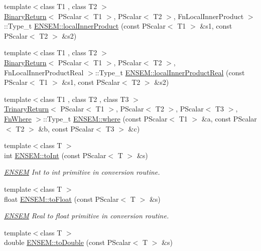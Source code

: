 \begin{DoxyCompactItemize}
\item 
{\footnotesize template$<$class T1 , class T2 $>$ }\\\mbox{\hyperlink{structBinaryReturn}{Binary\+Return}}$<$ P\+Scalar$<$ T1 $>$, P\+Scalar$<$ T2 $>$, Fn\+Local\+Inner\+Product $>$\+::Type\+\_\+t \mbox{\hyperlink{group__primscalar_ga1190a8f3bd7590e615a59825ca33f2b6}{E\+N\+S\+E\+M\+::local\+Inner\+Product}} (const P\+Scalar$<$ T1 $>$ \&s1, const P\+Scalar$<$ T2 $>$ \&s2)
\item 
{\footnotesize template$<$class T1 , class T2 $>$ }\\\mbox{\hyperlink{structBinaryReturn}{Binary\+Return}}$<$ P\+Scalar$<$ T1 $>$, P\+Scalar$<$ T2 $>$, Fn\+Local\+Inner\+Product\+Real $>$\+::Type\+\_\+t \mbox{\hyperlink{group__primscalar_ga014c96c783c136201ede1f2669b6d18b}{E\+N\+S\+E\+M\+::local\+Inner\+Product\+Real}} (const P\+Scalar$<$ T1 $>$ \&s1, const P\+Scalar$<$ T2 $>$ \&s2)
\item 
{\footnotesize template$<$class T1 , class T2 , class T3 $>$ }\\\mbox{\hyperlink{structTrinaryReturn}{Trinary\+Return}}$<$ P\+Scalar$<$ T1 $>$, P\+Scalar$<$ T2 $>$, P\+Scalar$<$ T3 $>$, \mbox{\hyperlink{structFnWhere}{Fn\+Where}} $>$\+::Type\+\_\+t \mbox{\hyperlink{group__primscalar_ga2696f074fb7cc4b547788bbf78867d23}{E\+N\+S\+E\+M\+::where}} (const P\+Scalar$<$ T1 $>$ \&a, const P\+Scalar$<$ T2 $>$ \&b, const P\+Scalar$<$ T3 $>$ \&c)
\item 
{\footnotesize template$<$class T $>$ }\\int \mbox{\hyperlink{group__primscalar_ga5ec99dbe9e18daf372190e5c3b1a00fa}{E\+N\+S\+E\+M\+::to\+Int}} (const P\+Scalar$<$ T $>$ \&s)
\begin{DoxyCompactList}\small\item\em \mbox{\hyperlink{namespaceENSEM}{E\+N\+S\+EM}} Int to int primitive in conversion routine. \end{DoxyCompactList}\item 
{\footnotesize template$<$class T $>$ }\\float \mbox{\hyperlink{group__primscalar_gab273a0c0a29e18b106644d9def35d745}{E\+N\+S\+E\+M\+::to\+Float}} (const P\+Scalar$<$ T $>$ \&s)
\begin{DoxyCompactList}\small\item\em \mbox{\hyperlink{namespaceENSEM}{E\+N\+S\+EM}} Real to float primitive in conversion routine. \end{DoxyCompactList}\item 
{\footnotesize template$<$class T $>$ }\\double \mbox{\hyperlink{group__primscalar_ga161f37d5fa3cda93eefdd3e606049805}{E\+N\+S\+E\+M\+::to\+Double}} (const P\+Scalar$<$ T $>$ \&s)

\end{DoxyCompactItemize}
